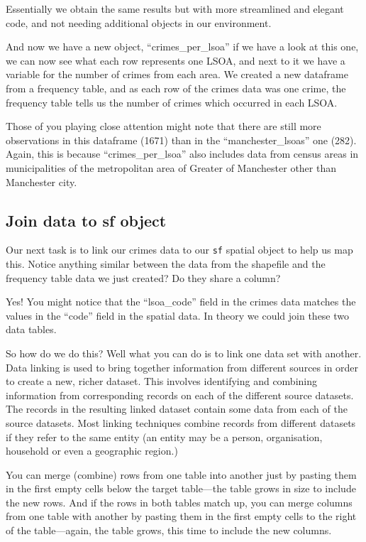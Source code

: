 \documentclass[
]{book}
\begin{document}
Essentially we obtain the same results but with more streamlined and elegant code, and not needing additional objects in our environment.

And now we have a new object, ``crimes\_per\_lsoa'' if we have a look at this one, we can now see what each row represents one LSOA, and next to it we have a variable for the number of crimes from each area. We created a new dataframe from a frequency table, and as each row of the crimes data was one crime, the frequency table tells us the number of crimes which occurred in each LSOA.

Those of you playing close attention might note that there are still more observations in this dataframe (1671) than in the ``manchester\_lsoas'' one (282). Again, this is because ``crimes\_per\_lsoa'' also includes data from census areas in municipalities of the metropolitan area of Greater of Manchester other than Manchester city.

\hypertarget{join-data-to-sf-object}{%
\subsection{Join data to sf object}\label{join-data-to-sf-object}}

Our next task is to link our crimes data to our \texttt{sf} spatial object to help us map this. Notice anything similar between the data from the shapefile and the frequency table data we just created? Do they share a column?

Yes! You might notice that the ``lsoa\_code'' field in the crimes data matches the values in the ``code'' field in the spatial data. In theory we could join these two data tables.

So how do we do this? Well what you can do is to link one data set with another. Data linking is used to bring together information from different sources in order to create a new, richer dataset. This involves identifying and combining information from corresponding records on each of the different source datasets. The records in the resulting linked dataset contain some data from each of the source datasets. Most linking techniques combine records from different datasets if they refer to the same entity (an entity may be a person, organisation, household or even a geographic region.)

You can merge (combine) rows from one table into another just by pasting them in the first empty cells below the target table---the table grows in size to include the new rows. And if the rows in both tables match up, you can merge columns from one table with another by pasting them in the first empty cells to the right of the table---again, the table grows, this time to include the new columns.
\end{document}
